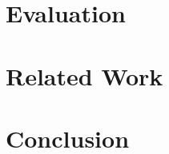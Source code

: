 \documentclass[sigplan,screen]{acmart}
\begin{document}
\section{Evaluation}
\label{sec.eval}


\section{Related Work}
\label{sec.related}

\section{Conclusion}
\label{sec.conclusion}



\end{document}
